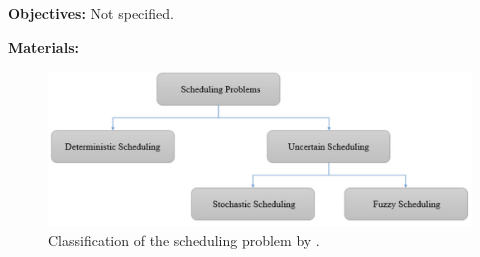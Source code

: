     \textbf{Objectives:}
        Not specified.

    
    \textbf{Materials:}
    \begin{figure}[H]
        \centering
        \includegraphics[width=1\textwidth]{figures/AR0030IR18/fig1.png}
        \caption{Classification of the scheduling problem by \cite{032IRSchedulingReview2020}.}
        \label{fig1:AR0030IR18}
    \end{figure}
    